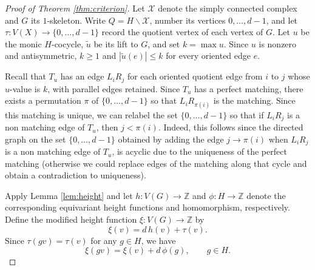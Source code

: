 \documentclass[10pt,a4paper]{amsart}
\newcommand{\Z}{\mathbb Z}
\begin{document}
\begin{proof}[Proof of Theorem \ref{thm:criterion}]
Let $\mathcal X$ denote the simply connected complex and $G$ its
$1$-skeleton. Write $Q=H\backslash\mathcal X$, number its vertices
$0,\ldots,d-1$, and let $\tau:V(X)\to \{0,\ldots,d-1\}$ record the quotient vertex of each vertex of $G$. Let $u$ be the monic $H$-cocycle,  $\widetilde u$ be its lift to $G$, and set
$k=\max u$. Since $u$ is nonzero and antisymmetric, $k\geq 1$ and
$|\widetilde u(e)|\leq k$ for every oriented edge $e$.

Recall that $T_u$ has an edge $L_iR_j$ for each oriented quotient edge
from $i$ to $j$ whose $u$-value is $k$, with parallel edges retained. Since $T_u$ has a perfect matching, there exists a permutation $\pi$ of $\{0,\ldots, d-1\}$ so that $L_i R_{\pi(i)}$ is the matching. Since this matching is unique, we can relabel the set $\{0,\ldots, d-1\}$ so that if $L_i R_j$ is a non matching edge of $T_u$, then $j < \pi(i)$. Indeed, this follows since the directed graph on the set $\{0,\ldots, d-1\}$ obtained by adding the edge $j \to \pi(i)$ when $L_iR_j$ is a non matching edge of $T_u$, is acyclic due to the uniqueness of the perfect matching (otherwise we could replace edges of the matching along that cycle and obtain a contradiction to uniqueness).

Apply Lemma \ref{lem:height} and let $h:V(G)\to \Z$ and $\phi:H\to\Z$ denote the corresponding equivariant height functions and homomorphism, respectively.
Define the modified height function $\xi:V(G)\to\Z$ by
\begin{equation*}\label{eq:repaired-modified-height}
  \xi(v)=d\,h(v)+\tau(v).
\end{equation*}
Since $\tau(gv)=\tau(v)$ for any $g\in H$, we have
\begin{equation}\label{eq:repaired-modified-equivariance}
  \xi(gv)=\xi(v)+d\,\phi(g),\qquad g\in H.
\end{equation}


\end{proof}
\end{document}
